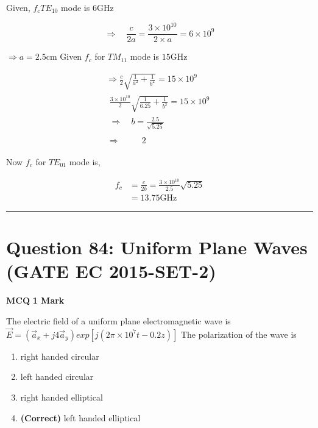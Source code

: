 \documentclass[11pt,a4paper]{article}
\begin{document}
\begin{tcolorbox}[solbox, title=Detailed Solution -- Question 83]
Given, $f_{c} T E_{10}$ mode is $6 \mathrm{GHz}$

\[
\Rightarrow \quad \frac{c}{2 a}=\frac{3 \times 10^{10}}{2 \times a}=6 \times 10^{9}
\]

$\Rightarrow a=2.5 \mathrm{cm}$
 Given $f_{c}$ for $T M_{11}$ mode is $15 \mathrm{GHz}$

\[
\begin{array}{l} \Rightarrow \frac{c}{2} \sqrt{\frac{1}{a^{2}}+\frac{1}{b^{2}}}=15 \times 10^{9} \\ \begin{array}{l} \frac{3 \times 10^{10}}{2} \sqrt{\frac{1}{6.25}+\frac{1}{b^{2}}}=15 \times 10^{9} \\ \Rightarrow \quad b=\frac{2.5}{\sqrt{5.25}} \end{array} \\ \begin{aligned} \Rightarrow \quad & \quad 2 \end{aligned} \end{array}
\]

 Now $f_{c}$ for $T E_{01}$ mode is,

\[
\begin{aligned} f_{c} &=\frac{c}{2 b}=\frac{3 \times 10^{10}}{2.5} \sqrt{5.25} \\ &=13.75 \mathrm{GHz} \end{aligned}
\]
\end{tcolorbox}

\vspace{1.5em}
\hrule
\vspace{1.5em}

\section*{Question 84: Uniform Plane Waves (GATE EC 2015-SET-2)}
\noindent \textbf{\color{primary}MCQ} \hfill \textbf{\color{secondary}1 Mark}


\noindent The electric field of a uniform plane electromagnetic wave is 
 $\vec{E}=(\vec{a}_{x}+j4\vec{a}_{y})exp[j(2\pi \times 10^{7}t-0.2z)]$  
 The polarization of the wave is


\begin{enumerate}[label=(\Alph*)]
    \item right handed circular
    \item left handed circular
    \item right handed elliptical
    \item \textbf{(Correct)} left handed elliptical
\end{enumerate}
\end{document}
